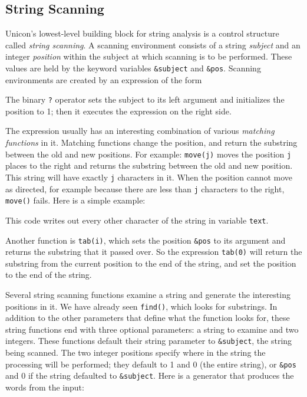 \subsection{String Scanning}

Unicon's lowest-level building block for string analysis is a control
structure called \textit{string scanning}. A
scanning environment consists of a string
\textit{subject} and an
integer \textit{position} within the subject at
which scanning is to be performed. These values are held by the keyword
variables \texttt{\&subject} and \texttt{\&pos}. Scanning environments
are created by an expression of the form


The binary \texttt{?} operator sets the subject to its left argument and
initializes the position to 1; then it executes the expression on the
right side.

The expression usually has an interesting combination of various
\textit{matching
functions} in it. Matching functions change the position, and return
the substring between the old and new positions. For example:
\texttt{move(j)} moves the position \texttt{j} places to the
right and returns the substring between the old and new position. This
string will have exactly \texttt{j} characters in it. When the position
cannot move as directed, for example because there are less than
\texttt{j} characters to the right, \texttt{move()}
fails. Here is a simple example:


This code writes out every other character of the string in variable
\texttt{text}.

Another function is \texttt{tab(i)}, which sets the
position \texttt{\&pos} to its argument and returns the substring that
it passed over. So the expression \texttt{tab(0)} will return the
substring from the current position to the end of the string, and set
the position to the end of the string.

Several string scanning functions examine a string and generate the interesting
positions in it. We have already seen \texttt{find()},
which looks for substrings. In addition to the other parameters that
define what the function looks for, these string functions end with
three optional parameters: a string to examine and two integers. These
functions default their string
parameter to \texttt{\&subject}, the string being scanned. The two
integer positions specify where in the string the processing will be
performed; they default to 1 and 0 (the entire string), or
\texttt{\&pos} and 0 if the string defaulted to \texttt{\&subject}.
Here is a generator that produces the words from the
input:

